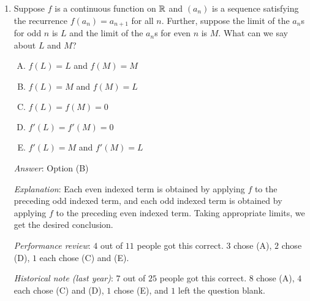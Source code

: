 \documentclass[10pt]{amsart}
\begin{document}
\begin{enumerate}
  {\em Answer}: Option (C)

  {\em Explanation}: Whatever the value of $a_1$, $0 < a_2 \le
  1/2$. Once we are in this interval, we see that $f(x) \ge x$ for all
  $x$ in the interval, and $f(x)$ is also in the interval. Thus, the
  sequence is monotonic non-decreasing from $a_2$ onward, and is
  bounded from above by $1/2$. It converges to its greatest lower
  bound, which we know must be fixed under $f$. Hence, it must
  converge to $1/2$, which is the only positive number fixed under
  $f$.

  (More details can be worked out using algebra/calculus).

  {\em Performance review}: $5$ out of $11$ got this correct. $4$
  chose (D), $1$ each chose (B) and (E).

  {\em Historical note (last year)}: $8$ out of $25$ people got this
  correct. $8$ people chose (D), $4$ chose (A), $3$ chose (E), $2$
  chose (B).

\item Suppose $f$ is a continuous function on $\mathbb{R}$ and $(a_n)$ is a
  sequence satisfying the recurrence $f(a_n) = a_{n+1}$ for all
  $n$. Further, suppose the limit of the $a_n$s for odd $n$ is $L$ and
  the limit of the $a_n$s for even $n$ is $M$. What can we say about
  $L$ and $M$?
  \begin{enumerate}[(A)]
  \item $f(L) = L$ and $f(M) = M$
  \item $f(L) = M$ and $f(M) = L$
  \item $f(L) = f(M) = 0$
  \item $f'(L) = f'(M) = 0$
  \item $f'(L) = M$ and $f'(M) = L$
  \end{enumerate}

  {\em Answer}: Option (B)

  {\em Explanation}: Each even indexed term is obtained by applying
  $f$ to the preceding odd indexed term, and each odd indexed term is
  obtained by applying $f$ to the preceding even indexed term. Taking
  appropriate limits, we get the desired conclusion.

  {\em Performance review}: $4$ out of $11$ people got this
  correct. $3$ chose (A), $2$ chose (D), $1$ each chose (C) and (E).

  {\em Historical note (last year)}: $7$ out of $25$ people got this
  correct. $8$ chose (A), $4$ each chose (C) and (D), $1$ chose (E),
  and $1$ left the question blank.


\end{enumerate}
\end{document}
